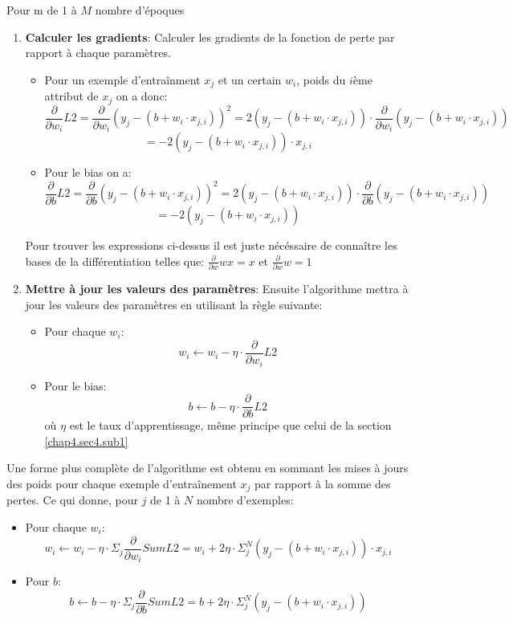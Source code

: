 Pour m de 1 à \(M\) nombre d'époques
\begin{enumerate}
    \item \textbf{Calculer les gradients}: Calculer les gradients de la fonction de perte par rapport à chaque paramètres.
    
    \begin{itemize}
        \item Pour un exemple d'entraînment \(x_j\) et un certain \(w_i\), poids du \(i\)ème attribut de \(x_j\) on a donc: \[\frac{\partial}{\partial w_i} L2 = \frac{\partial}{\partial w_i} (y_j - (b + w_i \cdot x_{j,i}))^2 = 2(y_j - (b + w_i \cdot x_{j,i})) \cdot \frac{\partial}{\partial w_i} (y_j - (b + w_i \cdot x_{j,i}))\] \[= -2(y_j - (b + w_i \cdot x_{j,i})) \cdot x_{j,i}\]
        \item Pour le bias on a: \[\frac{\partial}{\partial b} L2 = \frac{\partial}{\partial b} (y_j - (b + w_i \cdot x_{j,i}))^2 = 2(y_j - (b + w_i \cdot x_{j,i})) \cdot \frac{\partial}{\partial b} (y_j - (b + w_i \cdot x_{j,i}))\] \[= -2(y_j - (b + w_i \cdot x_{j,i}))\]
    \end{itemize}
    
    Pour trouver les expressions ci-dessus il est juste nécéssaire de connaître les bases de la différentiation telles que: \(\frac{\partial}{\partial w} wx = x\) et \(\frac{\partial}{\partial w} w = 1\)
    
    \item \textbf{Mettre à jour les valeurs des paramètres}: Ensuite l'algorithme mettra à jour les valeurs des paramètres en utilisant la règle suivante:
    
    \begin{itemize}
        \item Pour chaque \(w_i\): \[w_i \leftarrow w_i - \eta \cdot \frac{\partial}{\partial w_i} L2\]
        \item Pour le bias: \[b \leftarrow b - \eta \cdot \frac{\partial}{\partial b} L2\] où \(\eta\) est le taux d'apprentissage, même principe que celui de la section \ref{chap4.sec4.sub1}
    \end{itemize}
    
\end{enumerate}

Une forme plus complète de l'algorithme est obtenu en sommant les mises à jours des poids pour chaque exemple d'entraînement \(x_j\) par rapport à la somme des pertes. Ce qui donne, pour \(j\) de 1 à \(N\) nombre d'exemples:

\begin{itemize}
    \item Pour chaque \(w_i\): \[w_i \leftarrow w_i - \eta \cdot \Sigma_j \frac{\partial}{\partial w_i} SumL2 = w_i + 2\eta \cdot \Sigma_j^N (y_j - (b + w_i \cdot x_{j,i})) \cdot x_{j,i}\]
    \item Pour \(b\): \[b \leftarrow b - \eta \cdot \Sigma_j \frac{\partial}{\partial b} SumL2 = b + 2\eta \cdot \Sigma_j^N (y_j - (b + w_i \cdot x_{j,i}))\]
\end{itemize}

